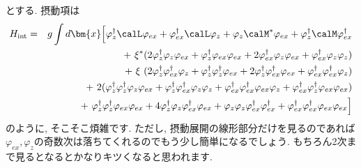 \documentclass[10.5pt,a4paper]{jreport}
\begin{document}
とする. 摂動項は
\begin{eqnarray}
  \nonumber  H_{\rm int} &=& g\int d\bm{x} \Bigl[\varphi_z^\dagger\calL\varphi_{ex} + \varphi_{ex}^\dagger\calL\varphi_z + \varphi_z\calM^*\varphi_{ex} + \varphi_z^\dagger\calM\varphi_{ex}^\dagger\\
    \nonumber  && +\ \xi^*(2\varphi_z^\dagger\varphi_z\varphi_{ex} + \varphi_z^\dagger\varphi_{ex}\varphi_{ex} + 2\varphi_{ex}^\dagger\varphi_z\varphi_{ex} + \varphi_{ex}^\dagger\varphi_z\varphi_z)\\
    \nonumber  && +\ \xi\ (2\varphi_z^\dagger\varphi_{ex}^\dagger\varphi_z + \varphi_z^\dagger\varphi_z^\dagger\varphi_{ex} + 2\varphi_z^\dagger\varphi_{ex}^\dagger\varphi_{ex} + \varphi_{ex}^\dagger\varphi_{ex}^\dagger\varphi_z)\\
    \nonumber  && +\ 2(\varphi^\dagger_z\varphi^\dagger_z\varphi_z\varphi_{ex} + \varphi^\dagger_z\varphi^\dagger_{ex}\varphi_z\varphi_z + \varphi_{ex}^\dagger\varphi^\dagger_{ex}\varphi_{ex}\varphi_{z} + \varphi^\dagger_{ex}\varphi^\dagger_{z}\varphi_{ex}\varphi_{ex}) \\
    && +\ \varphi^\dagger_z \varphi^\dagger_z \varphi_{ex}\varphi_{ex} + 4\varphi^\dagger_z \varphi_z \varphi^\dagger_{ex}\varphi_{ex} + \varphi_z \varphi_z \varphi^\dagger_{ex}\varphi^\dagger_{ex} + \varphi_{ex}^\dagger\varphi_{ex}^\dagger\varphi_{ex}\varphi_{ex}\Bigr]\label{ZeromodeHamiltonian}
\end{eqnarray}
のように, そこそこ煩雑です. ただし, 摂動展開の線形部分だけを見るのであれば$\varphi_{ex}, \varphi_z$の奇数次は落ちてくれるのでもう少し簡単になるでしょう. もちろん2次まで見るとなるとかなりキツくなると思われます.
\end{document}
